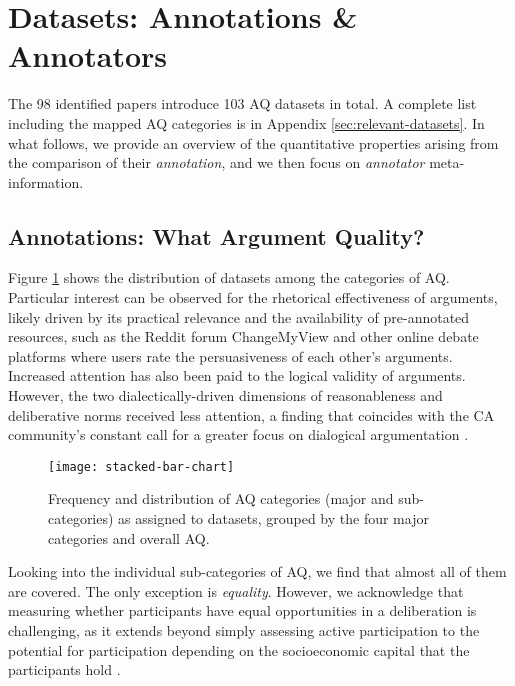 \section{Datasets: Annotations \& Annotators}
\label{sec:analysis}

The 98 identified papers introduce 103 AQ datasets in total. A complete list including the mapped AQ categories is in Appendix \ref{sec:relevant-datasets}. In what follows, we provide an overview of the quantitative properties arising from the comparison of their \textit{annotation}, and we then focus on  \textit{annotator} meta-information.

\subsection{Annotations: What Argument Quality?}

Figure \ref{fig:overview-aq} shows the distribution of datasets among the categories of AQ. Particular interest can be observed for the rhetorical effectiveness of arguments, likely driven by its practical relevance and the availability of pre-annotated resources, such as the Reddit forum ChangeMyView and other online debate platforms where users rate the persuasiveness of each other's arguments. Increased attention has also been paid to the logical validity of arguments. However, the two dialectically-driven dimensions of reasonableness and deliberative norms received less attention, a finding that coincides with the CA community's constant call for a greater focus on dialogical argumentation \cite{ruiz-dolz-etal-2024-overview}.

\begin{figure}[t]
  \texttt{[image: stacked-bar-chart]}
  \caption{Frequency and distribution of AQ categories (major and sub-categories) as assigned to datasets, grouped by the four major categories and overall AQ.}
  \label{fig:overview-aq}
\end{figure}

Looking into the individual sub-categories of AQ, we find that almost all of them are covered. The only exception is \emph{equality}. However, we acknowledge that measuring whether participants have equal opportunities in a deliberation is challenging, as it extends beyond simply assessing active participation to the potential for participation depending on the socioeconomic capital that the participants hold \cite{friess2015deliberation}.

